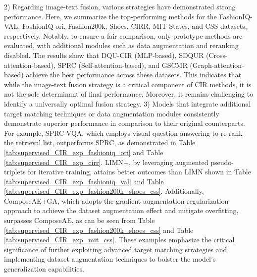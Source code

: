 2) Regarding image-text fusion, various strategies have demonstrated strong performance. Here, we summarize the top-performing methods for the FashionIQ-VAL, FashionIQ-ori, Fashion200k, Shoes, CIRR, MIT-States, and CSS datasets, respectively. Notably, to ensure a fair comparison, only prototype methods are evaluated, with additional modules such as data augmentation and reranking disabled.
The results show that DQU-CIR (MLP-based), SDQUR (Cross-attention-based), SPRC (Self-attention-based), and GSCMR (Graph-attention-based) achieve the best performance across these datasets. This indicates that while the image-text fusion strategy is a critical component of CIR methods, it is not the sole determinant of final performance. Moreover, it remains challenging to identify a universally optimal fusion strategy.
3) Models that integrate additional target matching techniques or data augmentation modules consistently demonstrate superior performance in comparison to their original counterparts. For example, SPRC-VQA, which employs visual question answering to re-rank the retrieval list, outperforms SPRC, as demonstrated in Table \ref{tab:supervised_CIR_exp_fashioniq_ori} and Table \ref{tab:supervised_CIR_exp_cirr}. LIMN+, by leveraging augmented pseudo-triplets for iterative training, attains better outcomes than LIMN shown in Table \ref{tab:supervised_CIR_exp_fashioniq_val} and Table \ref{tab:supervised_CIR_exp_fashion200k_shoes_css}. Additionally, ComposeAE+GA, which adopts the gradient augmentation regularization approach to achieve the dataset augmentation effect and mitigate overfitting, surpasses ComposeAE, as can be seen from Table \ref{tab:supervised_CIR_exp_fashion200k_shoes_css} and Table \ref{tab:supervised_CIR_exp_mit_css}. These examples emphasize the critical significance of further exploiting advanced target matching strategies and implementing dataset augmentation techniques to bolster the model's generalization capabilities.


